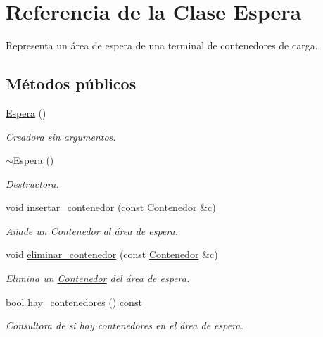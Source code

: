 \hypertarget{class_espera}{}\section{Referencia de la Clase Espera}
\label{class_espera}


Representa un área de espera de una terminal de contenedores de carga.  


\subsection*{Métodos públicos}
\begin{DoxyCompactItemize}
\item 
\hyperlink{class_espera_aeabb86dcbffd8c2b686fe330581ac82b}{Espera} ()
\begin{DoxyCompactList}\small\item\em Creadora sin argumentos. \end{DoxyCompactList}\item 
\hyperlink{class_espera_a970b7c780ad48f158c408586d4b3b4b3}{$\sim$\+Espera} ()
\begin{DoxyCompactList}\small\item\em Destructora. \end{DoxyCompactList}\item 
void \hyperlink{class_espera_a7154136eb8addbeebe5cc1406d6400c0}{insertar\+\_\+contenedor} (const \hyperlink{class_contenedor}{Contenedor} \&c)
\begin{DoxyCompactList}\small\item\em Añade un \hyperlink{class_contenedor}{Contenedor} al área de espera. \end{DoxyCompactList}\item 
void \hyperlink{class_espera_a925d1944461d0e9bedef4d788283b98f}{eliminar\+\_\+contenedor} (const \hyperlink{class_contenedor}{Contenedor} \&c)
\begin{DoxyCompactList}\small\item\em Elimina un \hyperlink{class_contenedor}{Contenedor} del área de espera. \end{DoxyCompactList}\item 
bool \hyperlink{class_espera_ae97d5ed76fdcf057835b51a87deaffb9}{hay\+\_\+contenedores} () const
\begin{DoxyCompactList}\small\item\em Consultora de si hay contenedores en el área de espera. \end{DoxyCompactList}\item 

\end{DoxyCompactItemize}
